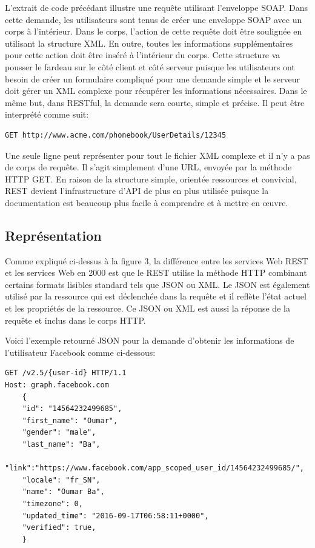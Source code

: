 L'extrait de code précédant illustre une requête utilisant l'enveloppe SOAP. Dans cette demande, les utilisateurs sont tenus de créer une enveloppe SOAP avec un corps à l'intérieur. Dans le corps, l'action de cette requête doit être soulignée en utilisant la structure XML. En outre, toutes les informations supplémentaires pour cette action doit être inséré à l'intérieur du corps. Cette structure va pousser le fardeau sur le côté client et côté serveur puisque les utilisateurs ont besoin de créer un formulaire compliqué pour une demande simple et le serveur doit gérer un XML complexe pour récupérer les informations nécessaires. Dans le même but, dans RESTful, la demande sera courte, simple et précise. Il peut être interprété comme suit:
\begin{verbatim}
GET http://www.acme.com/phonebook/UserDetails/12345
\end{verbatim}

Une seule ligne peut représenter pour tout le fichier XML complexe et il n'y a pas de corps de requête. Il s'agit simplement d'une URL, envoyée par la méthode HTTP GET. En raison de la structure simple, orientée ressources et convivial, REST devient l'infrastructure d'API de plus en plus utilisée puisque la documentation est beaucoup plus facile à comprendre et à mettre en œuvre.

\subsection{Représentation}
Comme expliqué ci-dessus à la figure 3, la différence entre les services Web REST et les services Web en 2000 est que le REST utilise la méthode HTTP combinant certains formats lisibles standard tels que JSON ou XML. Le JSON est également utilisé par la ressource qui est déclenchée dans la requête et il reflète l'état actuel et les propriétés de la ressource. Ce JSON ou XML est aussi la réponse de la requête et inclus dans le corps HTTP.

Voici l'exemple retourné JSON pour la demande d'obtenir les informations de l'utilisateur Facebook comme ci-dessous:
\begin{verbatim}
GET /v2.5/{user-id} HTTP/1.1
Host: graph.facebook.com
	{
	"id": "14564232499685", 
	"first_name": "Oumar", 
	"gender": "male", 
	"last_name": "Ba", 
	"link":"https://www.facebook.com/app_scoped_user_id/14564232499685/", 
	"locale": "fr_SN",
	"name": "Oumar Ba",
	"timezone": 0,
	"updated_time": "2016-09-17T06:58:11+0000",
	"verified": true, 
	}
\end{verbatim}

